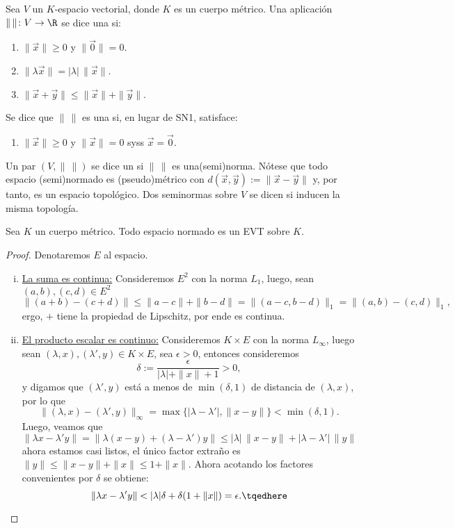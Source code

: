 \documentclass[topologia-analisis.tex]{subfiles}
\begin{document}
\begin{mydefi}
	Sea $V$ un $K$-espacio vectorial, donde $K$ es un cuerpo métrico.
	Una aplicación $\|\,\|\colon V \to \R$ se dice una  si:
	\begin{enumerate}[{SN}1.]
		\item $\|\vec x\| \ge 0$ y $\|\Vec 0\| = 0$.
		\item $\|\lambda\vec x\| = |\lambda| \, \|\vec x\|$.
		\item $\|\vec x + \vec y\| \le \|\vec x\| + \|\vec y\|$.
	\end{enumerate}
	Se dice que $\|\,\|$ es una  si, en lugar de SN1, satisface:
	\begin{enumerate}[{N}1.]
		\item $\|\vec x\| \ge 0$ y $\|\vec x\| = 0$ syss $\vec x = \Vec 0$.
	\end{enumerate}
	Un par $(V, \|\,\|)$ se dice un  si $\|\,\|$ es una\break (semi)norma.
	Nótese que todo espacio (semi)normado es (pseudo)métrico con $d(\vec x, \vec y) := \|\vec x - \vec y\|$ y,
	por tanto, es un espacio topológico.
	Dos seminormas sobre $V$ se dicen  si inducen la misma topología.
\end{mydefi}

\begin{thm}
	Sea $K$ un cuerpo métrico.
	Todo espacio normado es un EVT sobre $K$.
\end{thm}
\begin{proof}
	Denotaremos $E$ al espacio.
	\begin{enumerate}[i)]
		\item 
			\underline{La suma es continua:} 
			Consideremos $E^2$ con la norma $L_1$, luego, sean $(a,b),(c,d)\in E^2$
			$$ \|(a+b)-(c+d)\| \le \|a-c\| + \|b-d\| = \|(a-c,b-d)\|_1 = \|(a,b) - (c,d)\|_1, $$
			ergo, $+$ tiene la propiedad de Lipschitz, por ende es continua.

		\item \underline{El producto escalar es continuo:} 
			Consideremos $K\times E$ con la norma $L_\infty$, luego sean $(\lambda,x),(\lambda',y)\in K\times E$, sea $\epsilon > 0$,
			entonces consideremos
			$$ \delta := \frac{\epsilon}{|\lambda| + \|x\| + 1} > 0, $$
			y digamos que $(\lambda',y)$ está a menos de $\min(\delta, 1)$ de distancia de $(\lambda,x)$, por lo que
			$$ \|(\lambda,x) - (\lambda',y)\|_\infty = \max\{ |\lambda - \lambda'|, \|x - y\| \} < \min(\delta, 1). $$
			Luego, veamos que
			$$ \|\lambda x - \lambda'y\| = \|\lambda(x - y) + (\lambda - \lambda')y\| \le |\lambda|\, \|x - y\| + |\lambda - \lambda'|\,\|y\| $$
			ahora estamos casi listos, el único factor extraño es $\|y\| \le \|x - y\| + \|x\| \le 1 + \|x\|$.
			Ahora acotando los factores convenientes por $\delta$ se obtiene:
			\begin{equation}
				\|\lambda x - \lambda'y\| < |\lambda|\delta + \delta(1 + \|x\|) = \epsilon. \tqedhere
			\end{equation}
	\end{enumerate}
\end{proof}
\end{document}
